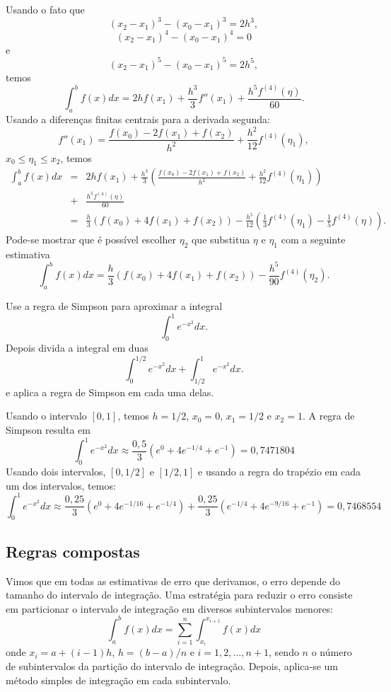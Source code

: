 Usando o fato que
$$
(x_2-x_1)^3-(x_0-x_1)^3=2h^3,
$$
$$
(x_2-x_1)^4-(x_0-x_1)^4=0
$$
e
$$
(x_2-x_1)^5-(x_0-x_1)^5=2h^5,
$$
temos
$$
\int_a^bf(x)dx=2hf(x_1)+\frac{h^3}{3}f''(x_1)+\frac{h^5f^{(4)}(\eta)}{60}.
$$
Usando a diferenças finitas centrais para a derivada segunda:
$$
f''(x_1)=\frac{f(x_0)-2f(x_1)+f(x_2)}{h^2}+\frac{h^2}{12}f^{(4)}(\eta_1),
$$
$x_0\leq \eta_1\leq x_2$, temos
\begin{eqnarray*}
\int_a^bf(x)dx&=&2hf(x_1)+\frac{h^3}{3}\left(\frac{f(x_0)-2f(x_1)+f(x_2)}{h^2}+\frac{h^2}{12}f^{(4)}(\eta_1)\right)\\
&+&\frac{h^5f^{(4)}(\eta)}{60}\\
&=&\frac{h}{3}\left(f(x_0)+4f(x_1)+f(x_2)\right)-\frac{h^5}{12}\left(\frac{1}{3}f^{(4)}(\eta_1)-\frac{1}{5}f^{(4)}(\eta)\right).
\end{eqnarray*}
Pode-se mostrar que é possível escolher $\eta_2$ que substitua $\eta$ e $\eta_1$ com a seguinte estimativa
$$
\int_a^bf(x)dx=\frac{h}{3}\left(f(x_0)+4f(x_1)+f(x_2)\right)-\frac{h^5}{90}f^{(4)}(\eta_2).
$$

\begin{ex}
Use a regra de Simpson para aproximar a integral
$$
\int_0^1e^{-x^2}dx.
$$
Depois divida a integral em duas
$$
\int_0^{1/2}e^{-x^2}dx+\int_{1/2}^{1}e^{-x^2}dx.
$$
e aplica a regra de Simpson em cada uma delas.
\end{ex}
Usando o intervalo $[0,1]$, temos $h=1/2$, $x_0=0$, $x_1=1/2$ e $x_2=1$. A regra de Simpson resulta em
$$
\int_0^1e^{-x^2}dx\approx \frac{0,5}{3}(e^{0}+4e^{-1/4}+e^{-1})=0,7471804
$$
Usando dois intervalos, $[0,1/2]$ e $[1/2,1]$ e usando a regra do trapézio em cada um dos intervalos, temos:
$$
\int_0^1e^{-x^2}dx\approx \frac{0,25}{3}(e^{0}+4e^{-1/16}+e^{-1/4})+\frac{0,25}{3}(e^{-1/4}+4e^{-9/16}+e^{-1})=0,7468554
$$

\subsection{Regras compostas}

Vimos que em todas as estimativas de erro que derivamos, o erro depende do tamanho do intervalo de integração. Uma estratégia para reduzir o erro consiste em particionar o intervalo de integração em diversos subintervalos menores:
\begin{equation*}
\int_{a}^b f(x)dx=\sum_{i=1}^{n} \int_{x_i}^{x_{i+1}} f(x)dx  
\end{equation*}
onde $x_i = a + (i-1)h$, $h = (b-a)/n$ e $i = 1,2,\dotsc,n+1$, sendo $n$ o número de subintervalos da partição do intervalo de integração. Depois, aplica-se um método simples de integração em cada subintervalo.

